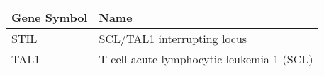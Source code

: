 \begin{tabular}{ll}
\toprule
Gene Symbol &                                      Name \\
\midrule
       STIL &               SCL/TAL1 interrupting locus \\
       TAL1 & T-cell acute lymphocytic leukemia 1 (SCL) \\
\bottomrule
\end{tabular}
